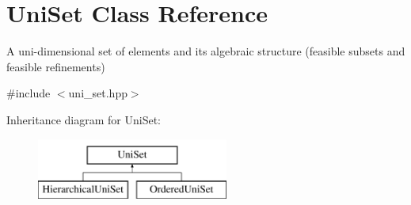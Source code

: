 \hypertarget{classUniSet}{\section{Uni\-Set Class Reference}
\label{classUniSet}
}


A uni-\/dimensional set of elements and its algebraic structure (feasible subsets and feasible refinements)  




{\ttfamily \#include $<$uni\-\_\-set.\-hpp$>$}

Inheritance diagram for Uni\-Set\-:\begin{figure}[H]
\begin{center}
\leavevmode
\includegraphics[height=2.000000cm]{classUniSet}
\end{center}
\end{figure}
